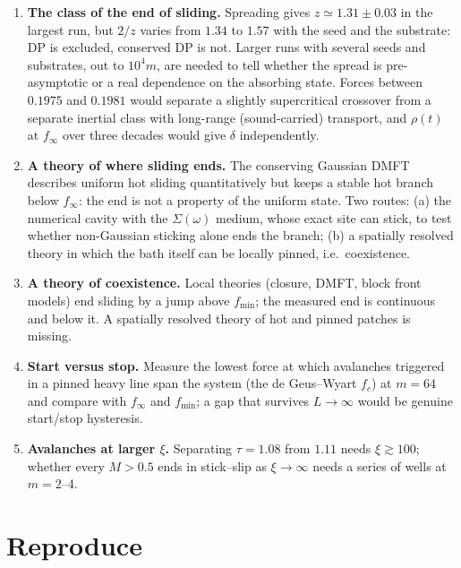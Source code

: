 \documentclass[10pt,a4paper]{article}
\begin{document}
\begin{enumerate}
\item \textbf{The class of the end of sliding.} Spreading gives $z\simeq1.31\pm0.03$ in the largest run, but $2/z$ varies from $1.34$ to $1.57$ with the seed and the substrate: DP is excluded, conserved DP is not. Larger runs with several seeds and substrates, out to $10^4m$, are needed to tell whether the spread is pre-asymptotic or a real dependence on the absorbing state. Forces between $0.1975$ and $0.1981$ would separate a slightly supercritical crossover from a separate inertial class with long-range (sound-carried) transport, and $\rho(t)$ at $f_\infty$ over three decades would give $\delta$ independently.
\item \textbf{A theory of where sliding ends.} The conserving Gaussian DMFT describes uniform hot sliding quantitatively but keeps a stable hot branch below $f_\infty$: the end is not a property of the uniform state. Two routes: (a) the numerical cavity with the $\Sigma(\omega)$ medium, whose exact site can stick, to test whether non-Gaussian sticking alone ends the branch; (b) a spatially resolved theory in which the bath itself can be locally pinned, i.e.\ coexistence.
\item \textbf{A theory of coexistence.} Local theories (closure, DMFT, block front models) end sliding by a jump above $f_{\min}$; the measured end is continuous and below it. A spatially resolved theory of hot and pinned patches is missing.
\item \textbf{Start versus stop.}\label{op:protocol} Measure the lowest force at which avalanches triggered in a pinned heavy line span the system (the de Geus--Wyart $f_c$) at $m=64$ and compare with $f_\infty$ and $f_{\min}$; a gap that survives $L\to\infty$ would be genuine start/stop hysteresis.
\item \textbf{Avalanches at larger $\xi$.}\label{op:xi} Separating $\tau=1.08$ from $1.11$ needs $\xi\gtrsim100$; whether every $M>0.5$ ends in stick--slip as $\xi\to\infty$ needs a series of wells at $m=2$--4.
\end{enumerate}

\section{Reproduce}
\label{sec:reproduce}
\end{document}
